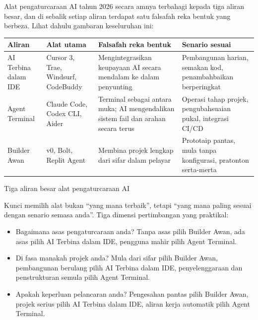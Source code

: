 


Alat pengaturcaraan AI tahun 2026 secara amnya terbahagi kepada tiga aliran besar, dan di sebalik setiap aliran terdapat satu falsafah reka bentuk yang berbeza. Lihat dahulu gambaran keseluruhan ini:

\begin{center}
\begin{tabularx}{\linewidth}{|X|X|X|X|}
\hline
\textbf{Aliran} & \textbf{Alat utama} & \textbf{Falsafah reka bentuk} & \textbf{Senario sesuai} \tabularnewline
\hline
AI Terbina dalam IDE & Cursor 3, Trae, Windsurf, CodeBuddy & Mengintegrasikan keupayaan AI secara mendalam ke dalam penyunting & Pembangunan harian, semakan kod, penambahbaikan berperingkat \tabularnewline
Agent Terminal & Claude Code, Codex CLI, Aider & Terminal sebagai antara muka; AI mengendalikan sistem fail dan arahan secara terus & Operasi tahap projek, pengubahsuaian pukal, integrasi CI/CD \tabularnewline
Builder Awan & v0, Bolt, Replit Agent & Membina projek lengkap dari sifar dalam pelayar & Prototaip pantas, mula tanpa konfigurasi, pratonton serta-merta \tabularnewline
\hline
\end{tabularx}
\end{center}

\begin{center}\small\color{gray}Tiga aliran besar alat pengaturcaraan AI\end{center}

Kunci memilih alat bukan “yang mana terbaik”, tetapi “yang mana paling sesuai dengan senario semasa anda”. Tiga dimensi pertimbangan yang praktikal:

\begin{itemize}
  \item Bagaimana asas pengaturcaraan anda? Tanpa asas pilih Builder Awan, ada asas pilih AI Terbina dalam IDE, pengguna mahir pilih Agent Terminal.
  \item Di fasa manakah projek anda? Mula dari sifar pilih Builder Awan, pembangunan berulang pilih AI Terbina dalam IDE, penyelenggaraan dan penstrukturan semula pilih Agent Terminal.
  \item Apakah keperluan pelancaran anda? Pengesahan pantas pilih Builder Awan, projek serius pilih AI Terbina dalam IDE, aliran kerja automatik pilih Agent Terminal.
\end{itemize}


